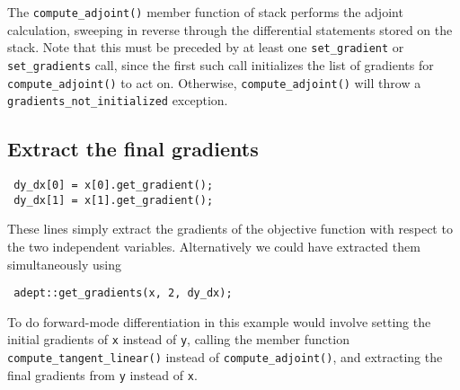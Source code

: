 \documentclass[a4,oneside]{book}
\def\codesize{\small}
\def\code#1{{\codesize\texttt{#1}}}
\begin{document}
The \code{compute\_adjoint()} member function of stack performs the
adjoint calculation, sweeping in reverse through the differential
statements stored on the stack. Note that this must be preceded by at
least one \code{set\_gradient} or \code{set\_gradients} call, since
the first such call initializes the list of gradients for
\code{compute\_adjoint()} to act on. Otherwise,
\code{compute\_adjoint()} will throw a
\code{gradients\_not\_initialized} exception. 

\subsection{Extract the final gradients}

\begin{lstlisting}
 dy_dx[0] = x[0].get_gradient();
 dy_dx[1] = x[1].get_gradient();
\end{lstlisting}
These lines simply extract the gradients of the objective function
with respect to the two independent variables. Alternatively we could
have extracted them simultaneously using
\begin{lstlisting}
 adept::get_gradients(x, 2, dy_dx);
\end{lstlisting}

To do forward-mode differentiation in this example would involve
setting the initial gradients of \code{x} instead of \code{y}, calling
the member function \code{compute\_tangent\_linear()} instead of
\code{compute\_adjoint()}, and extracting the final gradients from
\code{y} instead of \code{x}.
\end{document}
